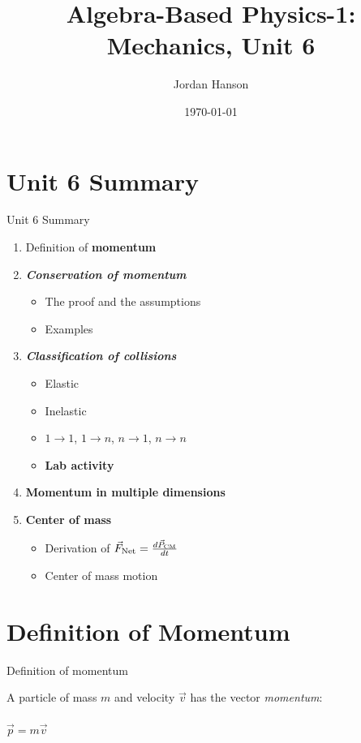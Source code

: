 \documentclass{beamer}
\title{Algebra-Based Physics-1: Mechanics, Unit 6}
\date{\today}
\author{Jordan Hanson}
\institute{Whittier College Department of Physics and Astronomy}
\begin{document}
\maketitle

\section{Unit 6 Summary}

\begin{frame}{Unit 6 Summary}
\begin{enumerate}
\item Definition of \alert{\textbf{momentum}}
\item \alert{\textbf{\textit{Conservation of momentum}}}
\begin{itemize}
\item The proof and the assumptions
\item Examples
\end{itemize}
\item \alert{\textbf{\textit{Classification of collisions}}}
\begin{itemize}
\item Elastic
\item Inelastic
\item $1 \rightarrow 1$, $1 \rightarrow n$, $n \rightarrow 1$, $n \rightarrow n$
\item \textbf{Lab activity}
\end{itemize}
\item \textbf{Momentum in multiple dimensions}
\item \textbf{Center of mass}
\begin{itemize}
\item Derivation of $\vec{F}_{\rm Net} = \frac{d\vec{P}_{\rm CM}}{dt}$
\item Center of mass motion
\end{itemize}
\end{enumerate}
\end{frame}

\section{Definition of Momentum}

\begin{frame}{Definition of momentum}
\begin{tcolorbox}[colback=white,colframe=red!40!blue,title=Definition of Momentum]
\alert{A particle of mass $m$ and velocity $\vec{v}$ has the vector \textit{momentum}:} \\ \\
\alert{$\vec{p} = m\vec{v}$}
\end{tcolorbox}
\end{frame}
\end{document}
